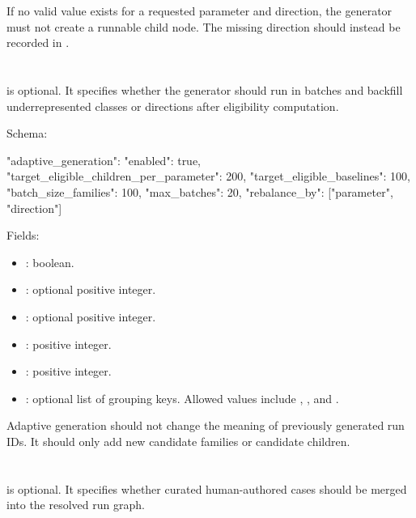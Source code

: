 \documentclass[11pt]{article}
\begin{document}
If no valid value exists for a requested parameter and direction, the generator must not create a runnable child node.
The missing direction should instead be recorded in .

\section*{}

 is optional.
It specifies whether the generator should run in batches and backfill underrepresented classes or directions after eligibility computation.

Schema:

\begin{DocCode}
"adaptive_generation": {
  "enabled": true,
  "target_eligible_children_per_parameter": 200,
  "target_eligible_baselines": 100,
  "batch_size_families": 100,
  "max_batches": 20,
  "rebalance_by": ["parameter", "direction"]
}
\end{DocCode}

Fields:

\begin{itemize}
    \item {}: boolean.
    \item {}: optional positive integer.
    \item {}: optional positive integer.
    \item {}: positive integer.
    \item {}: positive integer.
    \item {}: optional list of grouping keys. Allowed values include , , and .
\end{itemize}

Adaptive generation should not change the meaning of previously generated run IDs.
It should only add new candidate families or candidate children.

\section*{}

 is optional.
It specifies whether curated human-authored cases should be merged into the resolved run graph.
\end{document}

